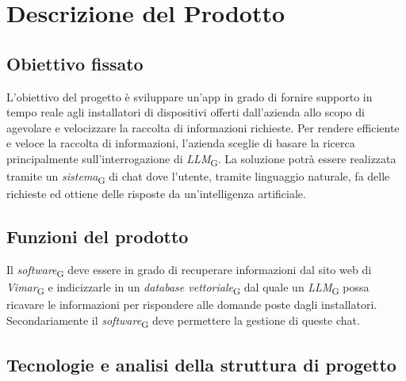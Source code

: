 \section{Descrizione del Prodotto}
\subsection{Obiettivo fissato}
L’obiettivo del progetto è sviluppare un’app in grado di fornire supporto in tempo reale agli installatori di dispositivi offerti dall’azienda allo scopo di agevolare e velocizzare la raccolta di informazioni richieste. Per rendere efficiente e veloce la raccolta di informazioni, l’azienda sceglie di basare la ricerca principalmente sull’interrogazione di \textit{LLM}\textsubscript{G}. La soluzione potrà essere realizzata tramite un \textit{sistema}\textsubscript{G} di chat dove l’utente, tramite linguaggio naturale, fa delle richieste ed ottiene delle risposte da un’intelligenza artificiale.

\subsection{Funzioni del prodotto}
Il \textit{software}\textsubscript{G} deve essere in grado di recuperare informazioni dal sito web di \textit{Vimar}\textsubscript{G} e indicizzarle in un \textit{database vettoriale}\textsubscript{G} dal quale un \textit{LLM}\textsubscript{G} possa ricavare le informazioni per rispondere alle domande poste dagli installatori.
Secondariamente il \textit{software}\textsubscript{G} deve permettere la gestione di queste chat.

\subsection{Tecnologie  e analisi della struttura di progetto} 
